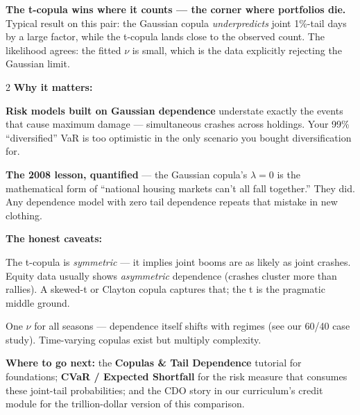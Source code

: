 \documentclass{pyportfolios-note}
\begin{document}
\noteneedroom{280bp}

\textbf{The t-copula wins where it counts — the corner where portfolios die.}
Typical result on this pair: the Gaussian copula \textit{underpredicts} joint
1\%-tail days by a large factor, while the t-copula lands close to the observed
count. The likelihood agrees: the fitted $\nu$ is small, which is the data
explicitly rejecting the Gaussian limit.

\begin{multicols}{2}
\textbf{Why it matters:}

\begin{notebullets}
\item \textbf{Risk models built on Gaussian dependence} understate exactly the
      events that cause maximum damage — simultaneous crashes across holdings.
      Your 99\% ``diversified'' VaR is too optimistic in the only scenario you
      bought diversification for.
\item \textbf{The 2008 lesson, quantified} — the Gaussian copula's
      $\lambda = 0$ is the mathematical form of ``national housing markets
      can't all fall together.'' They did. Any dependence model with zero tail
      dependence repeats that mistake in new clothing.
\end{notebullets}

\textbf{The honest caveats:}

\begin{notebullets}
\item The t-copula is \textit{symmetric} — it implies joint booms are as likely
      as joint crashes. Equity data usually shows \textit{asymmetric}
      dependence (crashes cluster more than rallies). A skewed-t or Clayton
      copula captures that; the t is the pragmatic middle ground.
\item One $\nu$ for all seasons — dependence itself shifts with regimes (see
      our 60/40 case study). Time-varying copulas exist but multiply
      complexity.
\end{notebullets}
\end{multicols}

\textbf{Where to go next:} the \textbf{Copulas \& Tail Dependence} tutorial for
foundations; \textbf{CVaR / Expected Shortfall} for the risk measure that
consumes these joint-tail probabilities; and the CDO story in our curriculum's
credit module for the trillion-dollar version of this comparison.
\end{document}

